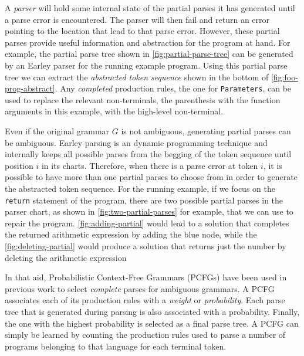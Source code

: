  A \emph{parser} will hold some
internal state of the partial parses it has generated until a parse error is
encountered. The parser will then fail and return an error pointing to the
location that lead to that parse error. However, these partial parses provide
useful information and abstraction for the program at hand. For example, the
partial parse tree shown in \autoref{fig:partial-parse-tree} can be generated by
an Earley parser for the running example program. Using this partial parse tree
we can extract the \emph{abstracted token sequence} shown in the bottom of
\autoref{fig:foo-prog-abstract}. Any \emph{completed} production rules, \eg the
one for \texttt{Parameters}, can be used to replace the relevant non-terminals,
\eg the parenthesis with the function arguments in this example, with the
high-level non-terminal.





 Even if the original grammar $G$ is
not ambiguous, generating partial parses can be ambiguous. Earley parsing is an
dynamic programming technique and internally keeps all possible parses from the
begging of the token sequence until position $i$ in its charts. Therefore, when
there is a parse error at token $i$, it is possible to have more than one
partial parses to choose from in order to generate the abstracted token
sequence. For the running example, if we focus on the \texttt{return} statement
of the program, there are two possible partial parses in the parser chart, as
shown in \autoref{fig:two-partial-parses} for example, that we can use to repair the program. \autoref{fig:adding-partial} would lead to a solution that completes the returned arithmetic expression by adding the blue node, while the \autoref{fig:deleting-partial} would produce a solution that returns just the number by deleting the arithmetic expression

In that aid, Probabilistic Context-Free Grammars (PCFGs) have been used in
previous work \citep{?} to select \emph{complete} parses for ambiguous grammars.
A PCFG associates each of its production rules with a \emph{weight} or
\emph{probability}. Each parse tree that is generated during parsing is also
associated with a probability. Finally, the one with the highest probability is
selected as a final parse tree. A PCFG can simply be learned \citep{?} by
counting the production rules used to parse a number of programs belonging to
that language for each terminal token.

